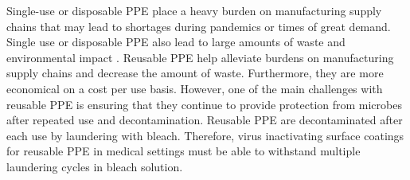 \documentclass[journal=jacsat,manuscript=article]{achemso}
\begin{document}
Single-use or disposable PPE place a heavy burden on manufacturing supply chains that may lead to shortages during pandemics or times of great demand.\cite{cohen_contributing_2020}  
Single use or disposable PPE also lead to large amounts of waste and environmental impact \cite{Overcash:12}.
Reusable PPE help alleviate burdens on manufacturing supply chains and decrease the amount of waste.  Furthermore, they are more economical on a cost per use basis.  \cite{Overcash:12} %
However, one of the main challenges with reusable PPE is ensuring that they continue to provide protection from microbes after repeated use and decontamination.  Reusable PPE are decontaminated after each use by laundering with bleach.  
Therefore, virus inactivating surface coatings for reusable PPE in medical settings must be able to withstand multiple laundering cycles in bleach solution. 


\end{document}
